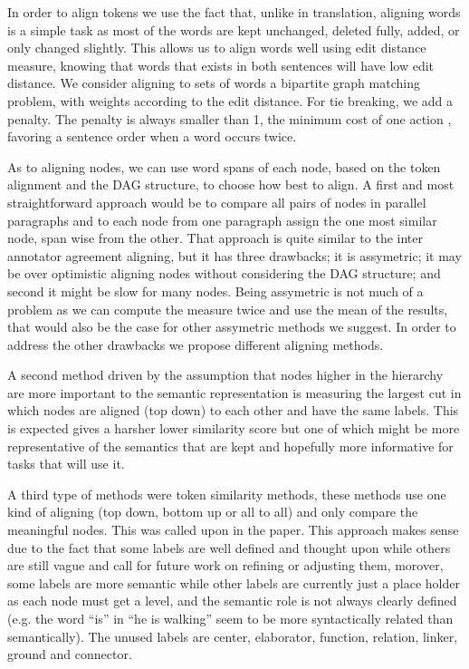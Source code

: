 \documentclass[11pt]{article}
\begin{document}
In order to align tokens we use the fact that, unlike in translation,
aligning words is a simple task as most of the words are kept unchanged,
deleted fully, added, or only changed slightly. This allows us to
align words well using edit distance measure, knowing that words that
exists in both sentences will have low edit distance. We consider
aligning to sets of words a bipartite graph matching problem, with
weights according to the edit distance. For tie breaking, we add a
penalty. The penalty is always smaller than 1, the minimum cost of
one action , favoring a sentence order when a word occurs twice.

As to aligning nodes, we can use word spans of each node, based on
the token alignment and the DAG structure, to choose how best to align.
A first and most straightforward approach would be to compare all
pairs of nodes in parallel paragraphs and to each node from one paragraph
assign the one most similar node, span wise from the other. That approach
is quite similar to the inter annotator agreement aligning, but it
has three drawbacks; it is assymetric; it may be over optimistic aligning
nodes without considering the DAG structure; and second it might be
slow for many nodes. Being assymetric is not much of a problem as
we can compute the measure twice and use the mean of the results,
that would also be the case for other assymetric methods we suggest.
In order to address the other drawbacks we propose different aligning
methods.

A second method driven by the assumption that nodes higher in the
hierarchy are more important to the semantic representation is measuring
the largest cut in which nodes are aligned (top down) to each other
and have the same labels. This is expected gives a harsher lower similarity
score but one of which might be more representative of the semantics
that are kept and hopefully more informative for tasks that will use
it.

A third type of methods were token similarity methods, these methods
use one kind of aligning (top down, bottom up or all to all) and only
compare the meaningful nodes. This was called upon in the \cite{sulem2015conceptual}
paper. This approach makes sense due to the fact that some labels
are well defined and thought upon while others are still vague and
call for future work on refining or adjusting them, morover, some
labels are more semantic while other labels are currently just a place
holder as each node must get a level, and the semantic role is not
always clearly defined (e.g. the word ``is'' in ``he is walking''
seem to be more syntactically related than semantically). The unused
labels are center, elaborator, function, relation, linker, ground
and connector.
\end{document}
